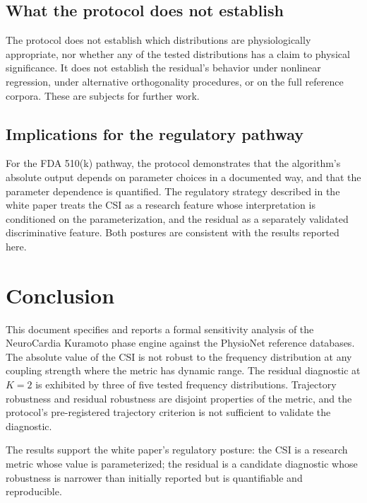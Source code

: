 \documentclass[11pt]{article}
\begin{document}
\subsection{What the protocol does not establish}

The protocol does not establish which distributions are physiologically
appropriate, nor whether any of the tested distributions has a claim to
physical significance. It does not establish the residual's behavior
under nonlinear regression, under alternative orthogonality procedures,
or on the full reference corpora. These are subjects for further work.

\subsection{Implications for the regulatory pathway}

For the FDA 510(k) pathway, the protocol demonstrates that the
algorithm's absolute output depends on parameter choices in a
documented way, and that the parameter dependence is quantified. The
regulatory strategy described in the white paper treats the CSI as a
research feature whose interpretation is conditioned on the
parameterization, and the residual as a separately validated
discriminative feature. Both postures are consistent with the results
reported here.

\section{Conclusion}

This document specifies and reports a formal sensitivity analysis of
the NeuroCardia Kuramoto phase engine against the PhysioNet reference
databases. The absolute value of the CSI is not robust to the frequency
distribution at any coupling strength where the metric has dynamic
range. The residual diagnostic at $K = 2$ is exhibited by three of five
tested frequency distributions. Trajectory robustness and residual
robustness are disjoint properties of the metric, and the protocol's
pre-registered trajectory criterion is not sufficient to validate the
diagnostic.

The results support the white paper's regulatory posture: the CSI is a
research metric whose value is parameterized; the residual is a
candidate diagnostic whose robustness is narrower than initially
reported but is quantifiable and reproducible.
\end{document}
